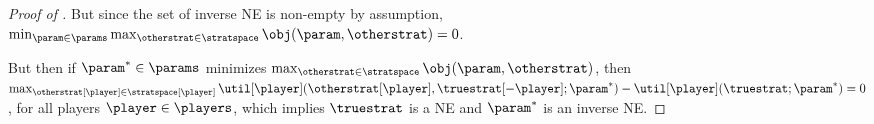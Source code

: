 \begin{proof}[Proof of ]
But since the set of inverse NE is non-empty by assumption, $\min_{\param \in \params} \max_{\otherstrat \in \stratspace} \obj (\param, \otherstrat) = 0$. 

But then if $\param^* \in \params$ minimizes $\max_{\otherstrat \in \stratspace} \obj (\param, \otherstrat)$, then $\max_{\otherstrat[\player] \in \stratspace[\player]} \util[\player] (\otherstrat[\player], \truestrat[-\player]; \param^*) - \util[\player] (\truestrat; \param^*) = 0$, for all players $\player \in \players$, which implies $\truestrat$ is a NE and $\param^*$ is an inverse NE.
\end{proof}



